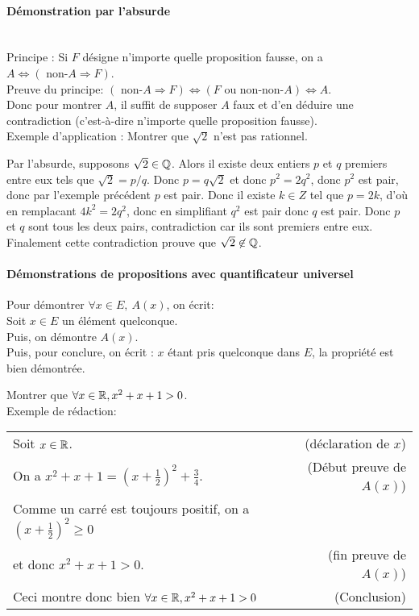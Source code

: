 {\paragraph{Démonstration par l'absurde}$ $\\
\\
Principe : Si $F$ désigne n'importe quelle proposition fausse, on a $A \Leftrightarrow (\text{ non-}A \Rightarrow F)$.\\
Preuve du principe: $(\text{ non-}A \Rightarrow F) \Leftrightarrow (F\text{ ou non-non-}A)\Leftrightarrow A$.\\
 Donc pour montrer $A$, il suffit de supposer $A$ faux et d'en déduire une contradiction (c'est-à-dire n'importe quelle proposition fausse).\\
Exemple d'application : Montrer que $\sqrt{2}$ n'est pas rationnel.\\
\begin{red} Par l'absurde, supposons $\sqrt{2}\in\mathbb{Q}$. Alors il existe deux entiers $p$ et $q$ premiers entre eux tels que $\sqrt{2} = p/q$. Donc $p = q\sqrt{2}$ et donc $p^2 = 2 q^2$, donc $p^2$ est pair, donc par l'exemple précédent $p$ est pair. Donc il existe $k\in Z$ tel que $p = 2k$, d'où en remplacant $4k^2 = 2 q^2$, donc en simplifiant $q^2$ est pair donc $q$ est pair. Donc $p$ et $q$ sont tous les deux pairs, contradiction car ils sont premiers entre eux. Finalement cette contradiction prouve que $\sqrt{2} \not\in \mathbb{Q}$.\end{red}

\paragraph{Démonstrations de propositions avec quantificateur universel}$ $\\

Pour démontrer $\forall x\in E,\:A(x)$, on écrit:\\
\og Soit $x\in E$ un élément quelconque\fg.\\
Puis, on démontre $A(x)$.\\
Puis, pour conclure, on écrit : \og $x$ étant pris quelconque dans $E$, la propriété est bien démontrée\fg.\\


\begin{exemple}Montrer que $\forall x\in \mathbb{R}, x^2+x+1> 0$\fg.\\

Exemple de rédaction:\\
\begin{tabular}{lr}
Soit $x\in \mathbb{R}$. & (déclaration de $x$)\\
On a $x^2+x+1 = (x+\frac12)^2+\frac34$. & (Début preuve de $A(x)$)\\
Comme un carré est toujours positif, on a $(x+\frac12)^2 \geq 0$ & \\
 et donc  $x^2+x+1>0$. & (fin preuve de $A(x)$)\\
Ceci montre donc bien $\forall x\in \mathbb{R}, x^2+x+1>0$ & (Conclusion)\\
\end{tabular}
\end{exemple}


}
